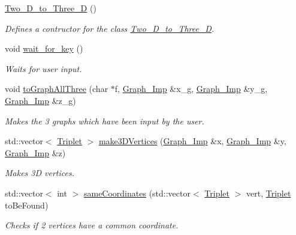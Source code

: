 \begin{DoxyCompactItemize}
\item 
\mbox{\label{class_two___d__to___three___d_af7791b37bdecba91105c78288a316a03}} 
\mbox{\hyperlink{class_two___d__to___three___d_af7791b37bdecba91105c78288a316a03}{Two\+\_\+\+D\+\_\+to\+\_\+\+Three\+\_\+D}} ()
\begin{DoxyCompactList}\small\item\em Defines a contructor for the class \mbox{\hyperlink{class_two___d__to___three___d}{Two\+\_\+\+D\+\_\+to\+\_\+\+Three\+\_\+D}}. \end{DoxyCompactList}\item 
void \mbox{\hyperlink{class_two___d__to___three___d_a9638402aac7b52a7726de911b074ea50}{wait\+\_\+for\+\_\+key}} ()
\begin{DoxyCompactList}\small\item\em Waits for user input. \end{DoxyCompactList}\item 
void \mbox{\hyperlink{class_two___d__to___three___d_ac24543905f60e508c904e0bfaf80beb3}{to\+Graph\+All\+Three}} (char $\ast$f, \mbox{\hyperlink{class_graph___imp}{Graph\+\_\+\+Imp}} \&x\+\_\+g, \mbox{\hyperlink{class_graph___imp}{Graph\+\_\+\+Imp}} \&y\+\_\+g, \mbox{\hyperlink{class_graph___imp}{Graph\+\_\+\+Imp}} \&z\+\_\+g)
\begin{DoxyCompactList}\small\item\em Makes the 3 graphs which have been input by the user. \end{DoxyCompactList}\item 
std\+::vector$<$ \mbox{\hyperlink{struct_triplet}{Triplet}} $>$ \mbox{\hyperlink{class_two___d__to___three___d_ac156d9425d380452759aa31be1d67de9}{make3\+D\+Vertices}} (\mbox{\hyperlink{class_graph___imp}{Graph\+\_\+\+Imp}} \&x, \mbox{\hyperlink{class_graph___imp}{Graph\+\_\+\+Imp}} \&y, \mbox{\hyperlink{class_graph___imp}{Graph\+\_\+\+Imp}} \&z)
\begin{DoxyCompactList}\small\item\em Makes 3D vertices. \end{DoxyCompactList}\item 
std\+::vector$<$ int $>$ \mbox{\hyperlink{class_two___d__to___three___d_addf6a41c6a1f93e172362ef42e5a3ca3}{same\+Coordinates}} (std\+::vector$<$ \mbox{\hyperlink{struct_triplet}{Triplet}} $>$ vert, \mbox{\hyperlink{struct_triplet}{Triplet}} to\+Be\+Found)
\begin{DoxyCompactList}\small\item\em Checks if 2 vertices have a common coordinate. \end{DoxyCompactList}\item 

\end{DoxyCompactItemize}
